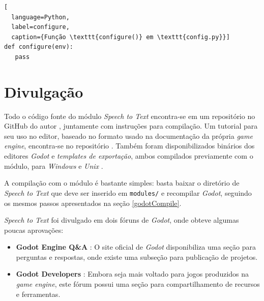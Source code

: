 \begin{lstlisting}[
  language=Python,
  label=configure,
  caption={Função \texttt{configure()} em \texttt{config.py}}]
def configure(env):
   pass
\end{lstlisting}


\section{Divulgação}
\label{modulePublishing}

Todo o código fonte do módulo \textit{Speech to Text} encontra-se em um repositório no GitHub do autor \citep{sttModuleGitHub}, juntamente com instruções para compilação. Um tutorial para seu uso no editor, baseado no formato usado na documentação da própria \textit{game engine}, encontra-se no repositório \citep{sttModuleTutorial}. Também foram disponibilizados binários dos editores \textit{Godot} e \textit{templates de exportação}, ambos compilados previamente com o módulo, para \textit{Windows} e \textit{Unix} \citep{sttModuleDownload}.

A compilação com o módulo é bastante simples: basta baixar o diretório de \textit{Speech to Text} que deve ser inserido em \texttt{modules/} e recompilar \textit{Godot}, seguindo os mesmos passos apresentados na seção \ref{godotCompile}.

\textit{Speech to Text} foi divulgado em dois fóruns de \textit{Godot}, onde obteve algumas poucas aprovações:

\begin{itemize}
\item \textbf{Godot Engine Q\&A} \citep{sttModuleGodotQA}: O site oficial de \textit{Godot} disponibiliza uma seção para perguntas e respostas, onde existe uma subseção para publicação de projetos.

\item \textbf{Godot Developers} \citep{sttModuleGodotDevelopers}: Embora seja mais voltado para jogos produzidos na \textit{game engine}, este fórum possui uma seção para compartilhamento de recursos e ferramentas.
\end{itemize}

